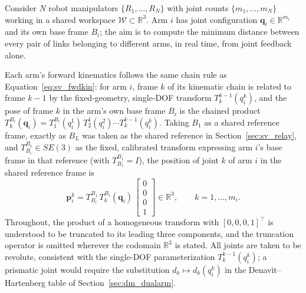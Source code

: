 Consider $N$ robot manipulators $\{R_1, \ldots, R_N\}$ with joint counts $\{m_1, \ldots, m_N\}$
working in a shared workspace $\mathcal{W} \subset \mathbb{R}^3$. Arm $i$ has joint configuration
$\mathbf{q}_i \in \mathbb{R}^{m_i}$ and its own base frame $B_i$; the aim is to compute the minimum
distance between every pair of links belonging to different arms, in real time, from joint feedback
alone.

Each arm's forward kinematics follows the same chain rule as Equation~\eqref{eq:sv_fwdkin}: for arm
$i$, frame $k$ of its kinematic chain is related to frame $k-1$ by the fixed-geometry, single-DOF
transform $T^{k-1}_{k}(q_i^k)$, and the pose of frame $k$ in the arm's own base frame $B_i$ is the
chained product $T^{B_i}_{k}(\mathbf{q}_i) = T^{B_i}_{1}(q_i^1)\, T^{1}_{2}(q_i^2) \cdots
T^{k-1}_{k}(q_i^k)$. Taking $B_1$ as a shared reference frame, exactly as $B_L$ was taken as the
shared reference in Section~\ref{sec:sv_relay}, and $T^{B_1}_{B_i} \in SE(3)$ as the fixed, calibrated
transform expressing arm $i$'s base frame in that reference (with $T^{B_1}_{B_1} = I$), the position
of joint $k$ of arm $i$ in the shared reference frame is
\begin{equation}
\mathbf{p}_i^k = T^{B_1}_{B_i}\, T^{B_i}_{k}(\mathbf{q}_i)\, \begin{bmatrix} 0 \\ 0 \\ 0 \\ 1 \end{bmatrix}
\in \mathbb{R}^3, \qquad k = 1, \ldots, m_i.
\label{eq:dm_jointpos}
\end{equation}
Throughout, the product of a homogeneous transform with $[0,0,0,1]^\top$ is understood to be
truncated to its leading three components, and the truncation operator is omitted wherever the
codomain $\mathbb{R}^3$ is stated. All joints are taken to be revolute, consistent with the
single-DOF parameterization $T^{k-1}_{k}(q_i^k)$; a prismatic joint would require the substitution
$d_k \mapsto d_k(q_i^k)$ in the Denavit--Hartenberg table of Section~\ref{sec:dm_dualarm}.

